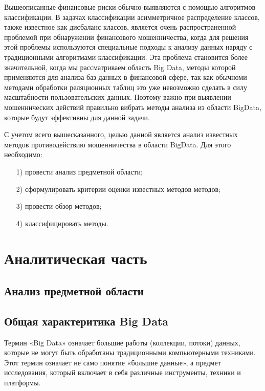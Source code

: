 \documentclass[12pt]{report}
\begin{document}
	Вышеописанные финансовые риски обычно выявляются с помощью алгоритмов классификации. В задачах классификации асимметричное распределение классов, также известное как дисбаланс классов, является очень распространенной проблемой при обнаружении финансового мошенничества, когда для решения этой проблемы используются специальные подходы к анализу данных наряду с традиционными алгоритмами классификации. Эта проблема становится более значительной, когда мы рассматриваем область Big Data, методы которой применяются для анализа баз данных в финансовой сфере, так как обычноми методами обработки реляционных таблиц это уже невозможно сделать в силу масштабности пользовательских данных. Поэтому важно при выявлении мошеннических действий правильно вибрать методы анализа из области BigData, которые будут эффективны для данной задачи.
	
	С учетом всего вышесказанного, целью данной является анализ известных методов противодействию мошенничества в области BigData. Для этого необходимо:
	\begin{enumerate}
		\item[1)] провести анализ предметной области;
		\item[2)] сформулировать критерии оценки известных методов методов;
		\item[3)] провести обзор методов;
		\item[4)] классифицировать методы.
	\end{enumerate}

	\chapter{Аналитическая часть}
	
	\section{Анализ предметной области}
	
	\section{Общая характеритика Big Data}
	
	Термин «Big Data» означает большие работы (коллекции, потоки) данных, которые не могут быть обработаны традиционными компьютерными техниками. Этот термин означает не само понятие «большие данные», а предмет исследования, который включает в себя различные инструменты, техники и платформы.
	
\end{document}
